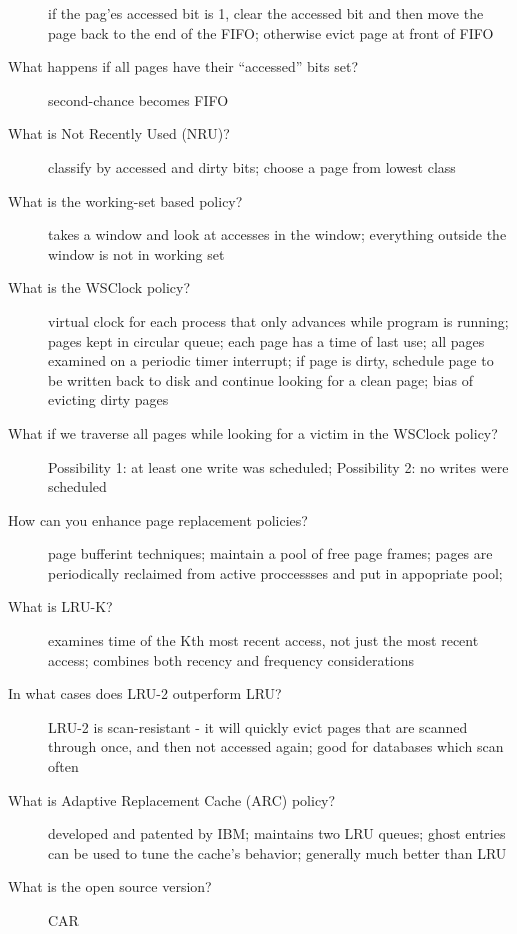 \documentclass[10pt]{article}
\begin{document}
\begin{description}
  if the pag'es accessed bit is 1, clear the accessed bit and then move the page back to the end of the FIFO;
  otherwise evict page at front of FIFO
\item[What happens if all pages have their “accessed” bits set?]
  second-chance becomes FIFO
\item[What is Not Recently Used (NRU)?]
  classify by accessed and dirty bits; choose a page from lowest class
\item[What is the working-set based policy?]
  takes a window and look at accesses in the window; everything outside the window is not in working set
\item[What is the WSClock policy?]
  virtual clock for each process that only advances while program is running;
  pages kept in circular queue; each page has a time of last use;
  all pages examined on a periodic timer interrupt;
  if page is dirty, schedule page to be written back to disk and continue looking for a clean page;
  bias of evicting dirty pages
\item[What if we traverse all pages while looking for a victim in the WSClock policy?]
  Possibility 1: at least one write was scheduled;
  Possibility 2: no writes were scheduled
\item[How can you enhance page replacement policies?]
  page bufferint techniques;
  maintain a pool of free page frames; pages are periodically reclaimed from active proccessses and put in appopriate pool;
\item[What is LRU-K?]
  examines time of the Kth most recent access, not just the most recent access;
  combines both recency and frequency considerations
\item[In what cases does LRU-2 outperform LRU?]
  LRU-2 is scan-resistant - it will quickly evict pages that are scanned through once, and then not accessed again;
  good for databases which scan often
\item[What is Adaptive Replacement Cache (ARC) policy?]
  developed and patented by IBM;
  maintains two LRU queues;
  ghost entries can be used to tune the cache's behavior;
  generally much better than LRU
\item[What is the open source version?]
  CAR
\end{description}
\end{document}
